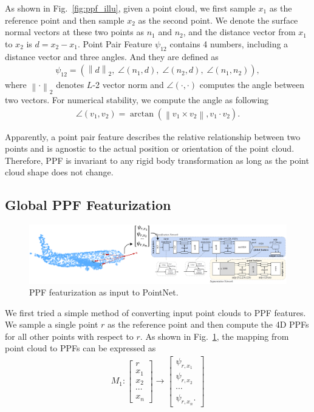 \documentclass{article}
\newcommand{\norm}[1]{\left\lVert#1\right\rVert}
\begin{document}
As shown in Fig.~\ref{fig:ppf_illu}, given a point cloud, we first sample $x_1$ as the reference point and then sample $x_2$ as the second point. We denote the surface normal vectors at these two points as $n_1$ and $n_2$, and the distance vector from $x_1$ to $x_2$ is $d=x_2-x_1$. Point Pair Feature $\psi_{12}$ contains 4 numbers, including a distance vector and three angles. And they are defined as 
\begin{align}
    \psi_{12} = (\norm{d}_2, \; \angle (n_1, d), \; \angle(n_2, d), \; \angle (n_1, n_2)),
\end{align}
where $\norm{\cdot}_2$ denotes $L$-2 vector norm and $\angle(\cdot, \cdot)$ computes the angle between two vectors. For numerical stability, we compute the angle as following \cite{Birdal2015-ppfbased}
\begin{align}
    \angle(v_1, v_2) = \arctan(\norm{v_1 \times v_2}, v_1\cdot v_2).
\end{align}

Apparently, a point pair feature describes the relative relationship between two points and is agnostic to the actual position or orientation of the point cloud. Therefore, PPF is invariant to any rigid body transformation as long as the point cloud shape does not change.  


\subsection{Global PPF Featurization}
\label{section:PPF_inp}

\begin{figure}[hbt!]
\centering
    \includegraphics[width=.9\linewidth]{images/pn_input.png}
    \caption{PPF featurization as input to PointNet.}
\label{fig:pn_input}
\end{figure}

We first tried a simple method of converting input point clouds to PPF features. We sample a single point $r$ as the reference point and then compute the 4D PPFs for all other points with respect to $r$. As shown in Fig.~\ref{fig:pn_input}, the mapping from point cloud to PPFs can be expressed as 
\begin{align}
    M_1 : 
    \begin{bmatrix}
    r \\ x_1 \\ x_2 \\ \cdots \\ x_n
    \end{bmatrix}
    \rightarrow
    \begin{bmatrix}
    \psi_{r,x_1} \\ \psi_{r,x_2} \\ \cdots \\ \psi_{r,x_n}.
    \end{bmatrix}
\end{align}
\end{document}
